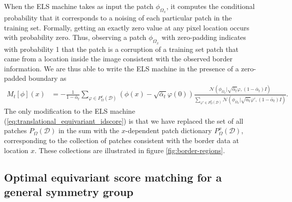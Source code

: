 \documentclass{article}
\theoremstyle{plain}
\theoremstyle{definition}
\theoremstyle{remark}
\begin{document}
When the ELS machine takes as input the patch $\phi_{\Omega_x}$, it computes the conditional probability that it corresponds to a noising of each particular patch in the training set. Formally, getting an exactly zero value at any pixel location occurs with probability zero. Thus, observing a patch $\phi_{\Omega_x}$ with zero-padding indicates with probability 1 that the patch is a corruption of a training set patch that came from a location inside the image consistent with the observed border information. We are thus able to write the ELS machine in the presence of a zero-padded boundary as
\begin{align}
    M_t[\phi](x) &= -\frac{1}{1 - \bar{\alpha}_t} \sum_{\varphi \in P_\Omega^x(\mathcal{D})} (\phi(x) - \sqrt{\bar{\alpha}_t}\varphi(0)) \frac{\mathcal{N}(\phi_{\Omega_x}|\sqrt{\bar{\alpha}_t} \varphi, (1 - \bar{\alpha}_t) I)}{\sum_{\varphi' \in P_\Omega^x(\mathcal{D})} \mathcal{N}(\phi_{\Omega_x} |\sqrt{\bar{\alpha}_t} \varphi', (1 - \bar{\alpha}_t) I)} .
\end{align}
The only modification to the ELS machine (\ref{eq:translational_equivariant_idscore}) is that we have replaced the set of all patches $P_{\Omega}(\mathcal{D})$ in the sum with the $x$-dependent patch dictionary $P_{\Omega}^x(\mathcal{D})$, corresponding to the collection of patches consistent with the border data at location $x$. These collections are illustrated in figure \ref{fig:border-regions}.


\subsection{Optimal equivariant score matching for a general symmetry group}\label{app:equivariance}
\end{document}
